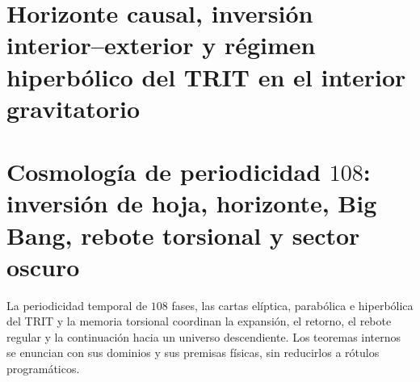 \chapter{Horizonte causal, inversión interior--exterior y régimen hiperbólico del TRIT en el interior gravitatorio}
\label{chap:md-horizonte-inversion-trit}



\chapter{Cosmología de periodicidad \texorpdfstring{\(108\)}{108}: inversión de hoja, horizonte, Big Bang, rebote torsional y sector oscuro}
\label{chap:md-cosmologia-periodicidad-108-definitiva}
La periodicidad temporal de \(108\) fases, las cartas elíptica, parabólica e
hiperbólica del TRIT y la memoria torsional coordinan la expansión, el retorno,
el rebote regular y la continuación hacia un universo descendiente. Los
teoremas internos se enuncian con sus dominios y sus premisas físicas, sin
reducirlos a rótulos programáticos.



\begingroup
\let\HMTOwnerSection\section
\let\HMTOwnerSubsection\subsection
\let\HMTOwnerSubsubsection\subsubsection
\let\HMTOwnerParagraph\paragraph
\let\chapter\HMTOwnerSection
\let\section\HMTOwnerSubsection

